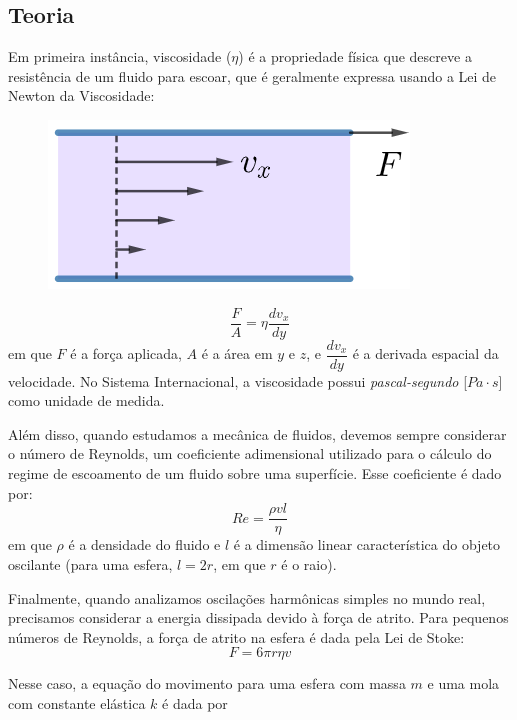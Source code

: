 \documentclass[a4paper, 12pt]{article}
\begin{document}
\begin{multicols}{2}
		\section{Teoria}
		\label{sec:teoria}
			\par Em primeira instância, viscosidade ($\eta$) é a propriedade física que descreve a resistência de um fluido para escoar, que é geralmente expressa usando a Lei de Newton da Viscosidade:
			\begin{figure}[H]
				\centering
				\includegraphics[scale=0.6]{./img/viscosidade.png}
			\end{figure}
			\begin{equation}
				\frac{F}{A} = \eta \dfrac{dv_x}{dy}
			\end{equation}
			em que $F$ é a força aplicada, $A$ é a área em $y$ e $z$, e $\dfrac{dv_x}{dy}$ é a derivada espacial da velocidade. No Sistema Internacional, a viscosidade possui \textit{pascal-segundo} [$Pa \cdot s$] como unidade de medida.
			\par Além disso, quando estudamos a mecânica de fluidos, devemos sempre considerar o número de Reynolds, um coeficiente adimensional utilizado para o cálculo do regime de escoamento de um fluido sobre uma superfície. Esse coeficiente é dado por:
			\begin{equation}
				Re = \frac{\rho v l}{\eta}
			\end{equation}
			em que $\rho$ é a densidade do fluido e $l$ é a dimensão linear característica do objeto oscilante (para uma esfera, $l = 2 r$, em que $r$ é o raio).
			\par Finalmente, quando analizamos oscilações harmônicas simples no mundo real, precisamos considerar a energia dissipada devido à força de atrito. Para pequenos números de Reynolds, a força de atrito na esfera é dada pela Lei de Stoke:
			\begin{equation}
				F = 6 \pi r \eta v
			\end{equation}
			\par Nesse caso, a equação do movimento para uma esfera com massa $m$ e uma mola com constante elástica $k$ é dada por

\end{multicols}
\end{document}
